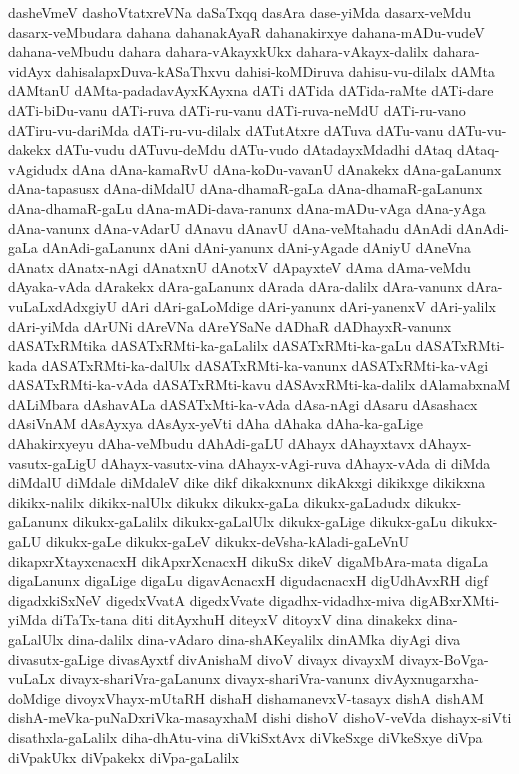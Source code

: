 {dasheVmeV
dashoVtatxreVNa
daSaTxqq
dasAra
dase-yiMda
dasarx-veMdu
dasarx-veMbudara
dahana
dahanakAyaR
dahanakirxye
dahana-mADu-vudeV
dahana-veMbudu
dahara
dahara-vAkayxkUkx
dahara-vAkayx-dalilx
dahara-vidAyx
dahisalapxDuva-kASaThxvu
dahisi-koMDiruva
dahisu-vu-dilalx
dAMta
dAMtanU
dAMta-padadavAyxKAyxna
dATi
dATida
dATida-raMte
dATi-dare
dATi-biDu-vanu
dATi-ruva
dATi-ru-vanu
dATi-ruva-neMdU
dATi-ru-vano
dATiru-vu-dariMda
dATi-ru-vu-dilalx
dATutAtxre
dATuva
dATu-vanu
dATu-vu-dakekx
dATu-vudu
dATuvu-deMdu
dATu-vudo
dAtadayxMdadhi
dAtaq
dAtaq-vAgidudx
dAna
dAna-kamaRvU
dAna-koDu-vavanU
dAnakekx
dAna-gaLanunx
dAna-tapasusx
dAna-diMdalU
dAna-dhamaR-gaLa
dAna-dhamaR-gaLanunx
dAna-dhamaR-gaLu
dAna-mADi-dava-ranunx
dAna-mADu-vAga
dAna-yAga
dAna-vanunx
dAna-vAdarU
dAnavu
dAnavU
dAna-veMtahadu
dAnAdi
dAnAdi-gaLa
dAnAdi-gaLanunx
dAni
dAni-yanunx
dAni-yAgade
dAniyU
dAneVna
dAnatx
dAnatx-nAgi
dAnatxnU
dAnotxV
dApayxteV
dAma
dAma-veMdu
dAyaka-vAda
dArakekx
dAra-gaLanunx
dArada
dAra-dalilx
dAra-vanunx
dAra-vuLaLxdAdxgiyU
dAri
dAri-gaLoMdige
dAri-yanunx
dAri-yanenxV
dAri-yalilx
dAri-yiMda
dArUNi
dAreVNa
dAreYSaNe
dADhaR
dADhayxR-vanunx
dASATxRMtika
dASATxRMti-ka-gaLalilx
dASATxRMti-ka-gaLu
dASATxRMti-kada
dASATxRMti-ka-dalUlx
dASATxRMti-ka-vanunx
dASATxRMti-ka-vAgi
dASATxRMti-ka-vAda
dASATxRMti-kavu
dASAvxRMti-ka-dalilx
dAlamabxnaM
dALiMbara
dAshavALa
dASATxMti-ka-vAda
dAsa-nAgi
dAsaru
dAsashacx
dAsiVnAM
dAsAyxya
dAsAyx-yeVti
dAha
dAhaka
dAha-ka-gaLige
dAhakirxyeyu
dAha-veMbudu
dAhAdi-gaLU
dAhayx
dAhayxtavx
dAhayx-vasutx-gaLigU
dAhayx-vasutx-vina
dAhayx-vAgi-ruva
dAhayx-vAda
di
diMda
diMdalU
diMdale
diMdaleV
dike
dikf
dikakxnunx
dikAkxgi
dikikxge
dikikxna
dikikx-nalilx
dikikx-nalUlx
dikukx
dikukx-gaLa
dikukx-gaLadudx
dikukx-gaLanunx
dikukx-gaLalilx
dikukx-gaLalUlx
dikukx-gaLige
dikukx-gaLu
dikukx-gaLU
dikukx-gaLe
dikukx-gaLeV
dikukx-deVsha-kAladi-gaLeVnU
dikapxrXtayxcnacxH
dikApxrXcnacxH
dikuSx
dikeV
digaMbAra-mata
digaLa
digaLanunx
digaLige
digaLu
digavAcnacxH
digudacnacxH
digUdhAvxRH
digf
digadxkiSxNeV
digedxVvatA
digedxVvate
digadhx-vidadhx-miva
digABxrXMti-yiMda
diTaTx-tana
diti
ditAyxhuH
diteyxV
ditoyxV
dina
dinakekx
dina-gaLalUlx
dina-dalilx
dina-vAdaro
dina-shAKeyalilx
dinAMka
diyAgi
diva
divasutx-gaLige
divasAyxtf
divAnishaM
divoV
divayx
divayxM
divayx-BoVga-vuLaLx
divayx-shariVra-gaLanunx
divayx-shariVra-vanunx
divAyxnugarxha-doMdige
divoyxVhayx-mUtaRH
dishaH
dishamanevxV-tasayx
dishA
dishAM
dishA-meVka-puNaDxriVka-masayxhaM
dishi
dishoV
dishoV-veVda
dishayx-siVti
disathxla-gaLalilx
diha-dhAtu-vina
diVkiSxtAvx
diVkeSxge
diVkeSxye
diVpa
diVpakUkx
diVpakekx
diVpa-gaLalilx
}
